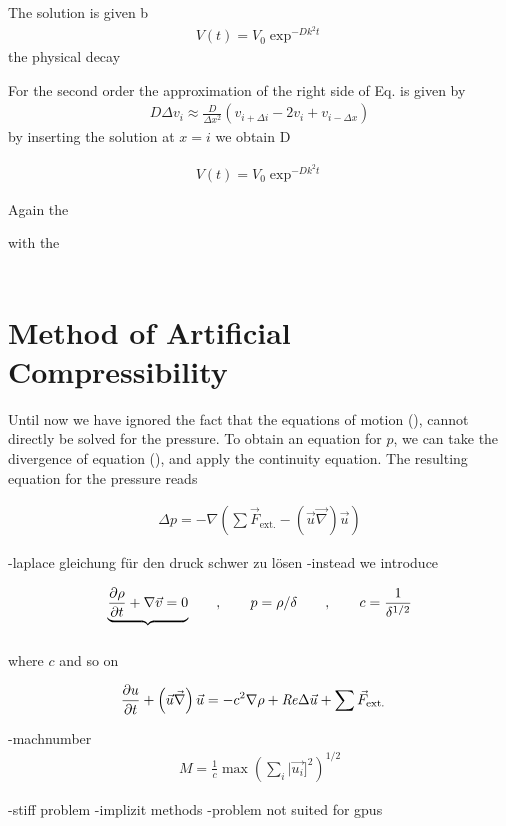 The solution is given b
\begin{align}
    V(t) = V_0 \exp^{-Dk^2t}
\end{align}
the physical decay

For the second order the approximation of the right side of Eq. is given by
\begin{align}
    D \Delta v_i  \approx \frac{D}{\Delta x^2}\left(v_{i+\Delta i} - 2v_i + v_{i-\Delta x} \right)
\end{align}
by inserting the solution at $x=i$ we obtain
D

\begin{align}
    V(t) = V_0 \exp^{-Dk^2t}
\end{align}



Again the

with the





\begin{align}
 \label{NUMERIC:NUMVIS}
\end{align}


\section{Method of Artificial Compressibility}

Until now we have ignored the fact that the equations of motion (), cannot directly be solved for the pressure.
To obtain an equation for $p$, we can take the divergence of equation (), and apply the continuity equation.
The resulting equation for the pressure reads

\begin{align}
    \Delta p =  -\nabla \left( \sum \vec{F}_{\text{ext.}} - (\vec{u} \vec{\nabla}) \vec{u}\right)
\end{align}

-laplace gleichung für den druck schwer zu lösen
-instead we introduce

\begin{align}
    \underbrace{\pdn[\rho]{t} +  \nabla \vec{v} = 0}_{\label{bla}} \qquad , \qquad p =\rho/\delta \qquad, \qquad c=\frac{1}{\delta^{1/2}}
\end{align}

where $c$ and so on

\begin{align}
    \label{numerik:nsac}
    \pdn[u]{t} + \left(\vec{u} \vec{\nabla}\right) \vec{u} &= -c^2\nabla\rho + \Rey \Delta \vec{u}+\sum \vec{F}_{\text{ext.}}
\end{align}

-machnumber
\begin{align}
    M = \frac{1}{c}\max\left(\sum_i |\vec{u_i}]^2\right)^{1/2}
\end{align}


-stiff problem
-implizit methods
-problem not suited for gpus
